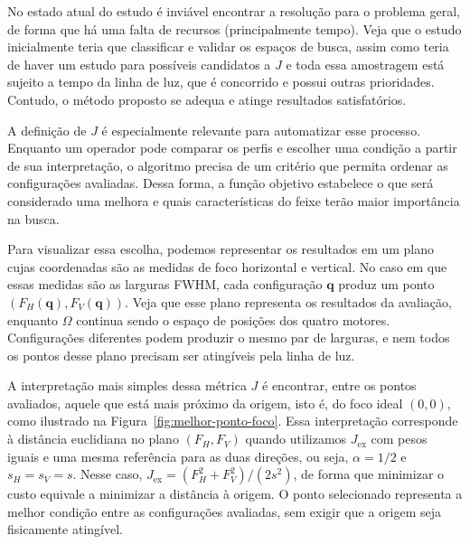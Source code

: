 \documentclass[12pt,a4paper]{article}
\begin{document}
No estado atual do estudo é inviável encontrar a resolução para o problema geral, de forma que há uma falta de recursos (principalmente tempo).
Veja que o estudo inicialmente teria que classificar e validar os espaços de busca, assim como teria de haver um estudo para possíveis candidatos a $J$ e toda essa amostragem está sujeito a tempo da linha de luz, que é concorrido e possui outras prioridades.
Contudo, o método proposto se adequa e atinge resultados satisfatórios.

A definição de $J$ é especialmente relevante para automatizar esse processo. Enquanto um operador pode comparar os perfis e escolher uma condição a partir de sua interpretação, o algoritmo precisa de um critério que permita ordenar as configurações avaliadas. Dessa forma, a função objetivo estabelece o que será considerado uma melhora e quais características do feixe terão maior importância na busca.

Para visualizar essa escolha, podemos representar os resultados em um plano cujas coordenadas são as medidas de foco horizontal e vertical. No caso em que essas medidas são as larguras FWHM, cada configuração $\mathbf{q}$ produz um ponto $(F_H(\mathbf{q}),F_V(\mathbf{q}))$. Veja que esse plano representa os resultados da avaliação, enquanto $\Omega$ continua sendo o espaço de posições dos quatro motores. Configurações diferentes podem produzir o mesmo par de larguras, e nem todos os pontos desse plano precisam ser atingíveis pela linha de luz.

A interpretação mais simples dessa métrica $J$ é encontrar, entre os pontos avaliados, aquele que está mais próximo da origem, isto é, do foco ideal $(0,0)$, como ilustrado na Figura~\ref{fig:melhor-ponto-foco}. Essa interpretação corresponde à distância euclidiana no plano $(F_H,F_V)$ quando utilizamos $J_{\mathrm{ex}}$ com pesos iguais e uma mesma referência para as duas direções, ou seja, $\alpha=1/2$ e $s_H=s_V=s$. Nesse caso, $J_{\mathrm{ex}}=(F_H^2+F_V^2)/(2s^2)$, de forma que minimizar o custo equivale a minimizar a distância à origem. O ponto selecionado representa a melhor condição entre as configurações avaliadas, sem exigir que a origem seja fisicamente atingível.
\end{document}
